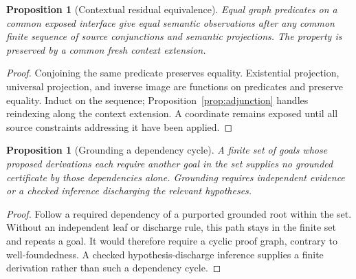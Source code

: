 \documentclass[10pt,a4paper]{article}
\newtheorem{proposition}[definition]{Proposition}
\theoremstyle{remark}
\begin{document}
\begin{proposition}[Contextual residual equivalence]\label{prop:future}
Equal graph predicates on a common exposed interface give equal semantic observations
after any common finite sequence of source conjunctions and semantic projections.
The property is preserved by a common fresh context extension.
\end{proposition}
\begin{proof}
Conjoining the same predicate preserves equality. Existential projection,
universal projection, and inverse image are functions on predicates and
preserve equality. Induct on the sequence; Proposition~\ref{prop:adjunction}
handles reindexing along the context extension. A coordinate remains exposed
until all source constraints addressing it have been applied.
\end{proof}

\begin{proposition}[Grounding a dependency cycle]\label{prop:no-cycle}
A finite set of goals whose proposed derivations each require another goal in
the set supplies no grounded certificate by those dependencies alone. Grounding
requires independent evidence or a checked inference discharging the relevant
hypotheses.
\end{proposition}
\begin{proof}
Follow a required dependency of a purported grounded root within the set.
Without an independent leaf or discharge rule, this path stays in the finite
set and repeats a goal. It would therefore require a cyclic proof graph,
contrary to well-foundedness. A checked hypothesis-discharge inference supplies
a finite derivation rather than such a dependency cycle.
\end{proof}
\end{document}
